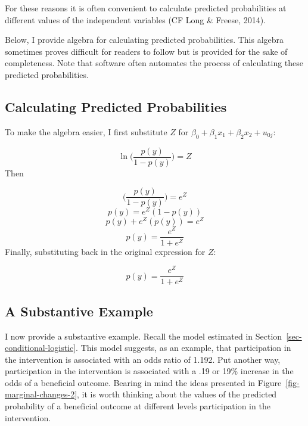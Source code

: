 \documentclass[
  letterpaper,
  DIV=11,
  numbers=noendperiod]{scrreprt}
\begin{document}
For these reasons it is often convenient to calculate predicted
probabilities at different values of the independent variables (CF Long
\& Freese, 2014). 

\begin{tcolorbox}[enhanced jigsaw, opacityback=0, coltitle=black, rightrule=.15mm, toprule=.15mm, bottomtitle=1mm, bottomrule=.15mm, breakable, colframe=quarto-callout-tip-color-frame, titlerule=0mm, opacitybacktitle=0.6, leftrule=.75mm, left=2mm, colback=white, toptitle=1mm, colbacktitle=quarto-callout-tip-color!10!white, title=\textcolor{quarto-callout-tip-color}{\faLightbulb}\hspace{0.5em}{The Algebra May Be Helpful}, arc=.35mm]

Below, I provide algebra for calculating predicted probabilities. This
algebra sometimes proves difficult for readers to follow but is provided
for the sake of completeness. Note that software often automates the
process of calculating these predicted probabilities.

\end{tcolorbox}

\subsection{Calculating Predicted
Probabilities}\label{calculating-predicted-probabilities}

To make the algebra easier, I first substitute \(Z\) for
\(\beta_0 + \beta_1 x_1 + \beta_2 x_2 + u_{0j}\):

\[\ln\Big(\frac{p(y)}{1-p(y)}\Big) = Z\] Then

\[\Big(\frac{p(y)}{1-p(y)}\Big) = e^Z\] \[p(y) = e^Z(1-p(y))\]
\[p(y) + e^Z(p(y)) = e^Z\] \[p(y) = \frac{e^Z}{1+e^Z}\] Finally,
substituting back in the original expression for \(Z\):

\[p(y) = \frac{e^Z}{1+e^Z}\]

\subsection{A Substantive Example}\label{a-substantive-example}

I now provide a substantive example. Recall the model estimated in
Section~\ref{sec-conditional-logistic}. This model suggests, as an
example, that participation in the intervention is associated with an
odds ratio of 1.192. Put another way, participation in the intervention
is associated with a .19 or 19\% increase in the odds of a beneficial
outcome. Bearing in mind the ideas presented in
Figure~\ref{fig-marginal-changes-2}, it is worth thinking about the
values of the predicted probability of a beneficial outcome at different
levels participation in the intervention.
\end{document}
